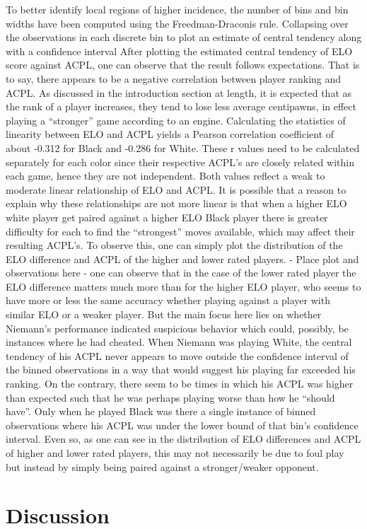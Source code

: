 \documentclass[12pt, letterpaper, titlepage]{article}
\begin{document}
To better identify local regions of higher incidence, the number of bins and bin widths have been computed using the Freedman-Draconis rule.
Collapsing over the observations in each discrete bin to plot an estimate of central tendency along with a confidence interval
After plotting the estimated central tendency of ELO score against ACPL, one can observe that the result follows expectations. That is to say, there appears to be a negative correlation between player ranking and ACPL. As discussed in the introduction section at length, it is expected that as the rank of a player increases, they tend to lose less average centipawns, in effect playing a “stronger” game according to an engine. Calculating the statistics of linearity between ELO and ACPL yields a Pearson correlation coefficient of about -0.312 for Black and -0.286 for White. These r values need to be calculated separately for each color since their respective ACPL's are closely related within each game, hence they are not independent. Both values reflect a weak to moderate linear relationship of ELO and ACPL. It is possible that a reason to explain why these relationships are not more linear is that when a higher ELO white player get paired against a higher ELO Black player there is greater difficulty for each to find the “strongest” moves available, which may affect their resulting ACPL's. 
To observe this, one can simply plot the distribution of the ELO difference and ACPL of the higher and lower rated players.
-	Place plot and observations here
-	one can observe that in the case of the lower rated player the ELO difference matters much more than for the higher ELO player, who seems to have more or less the same accuracy whether playing against a player with similar ELO or a weaker player.
But the main focus here lies on whether Niemann's performance indicated suspicious behavior which could, possibly, be instances where he had cheated. When Niemann was playing White, the central tendency of his ACPL never appears to move outside the confidence interval of the binned observations in a way that would suggest his playing far exceeded his ranking. On the contrary, there seem to be times in which his ACPL was higher than expected such that he was perhaps playing worse than how he “should have”. Only when he played Black was there a single instance of binned observations where his ACPL was under the lower bound of that bin's confidence interval. Even so, as one can see in the distribution of ELO differences and ACPL of higher and lower rated players, this may not necessarily be due to foul play but instead by simply being paired against a stronger/weaker opponent.

\section*{Discussion}
\label{sec:disc}




\end{document}
